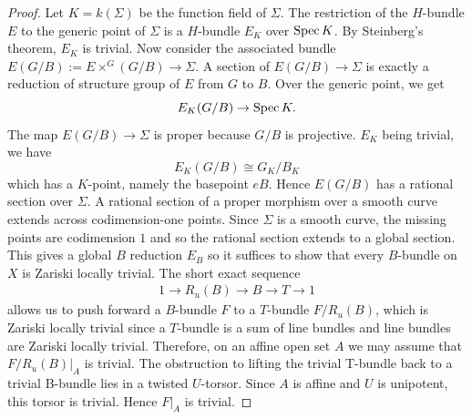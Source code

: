\documentclass[12pt]{article}
\begin{document}
\begin{proof}
    Let $K = k(\Sigma)$ be the function field of $\Sigma$. The restriction of the $H$-bundle $E$ to the generic point of $\Sigma$ is a $H$-bundle $E_K$ over $\operatorname{Spec} K$. By Steinberg's theorem, $E_K$ is trivial. Now consider the associated bundle $E(G/B):=E\times^G (G/B)\to \Sigma$. A section of $E(G/B)\to \Sigma$ is exactly a reduction of structure group of $E$ from $G$ to $B$. Over the generic point, we get
\[
E_K(G/B)\to \operatorname{Spec} K.
\]
The map $E(G/B) \to \Sigma$ is proper because $G/B$ is projective. $E_K$ being trivial, we have \[E_K(G/B)\cong G_K/B_K\] which has a $K$-point, namely the basepoint $eB$. Hence $E(G/B)$ has a rational section over $\Sigma$. A rational section of a proper morphism over a smooth curve extends across codimension-one points. Since $\Sigma$ is a smooth curve, the missing points are codimension $1$ and so the rational section extends to a global section. This gives a global $B$ reduction $E_B$ so it suffices to show that every $B$-bundle on $X$ is Zariski locally trivial. The short exact sequence \begin{align*}
    1 \to R_u(B) \to B \to T \to 1
\end{align*} allows us to push forward a $B$-bundle $F$ to a $T$-bundle $F/R_u(B)$, which is Zariski locally trivial since a $T$-bundle is a sum of line bundles and line bundles are Zariski locally trivial. Therefore, on an affine open set $A$ we may assume that $F/R_u(B)\vert_A$ is trivial. The obstruction to lifting the trivial T-bundle back to a trivial B-bundle lies in a twisted $U$-torsor. Since $A$ is affine and $U$ is unipotent, this torsor is trivial. Hence $F\vert_A$ is trivial.
\end{proof}
\end{document}
